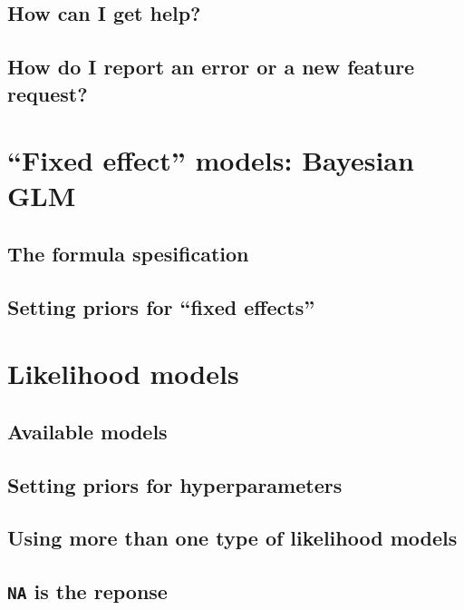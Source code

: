 \documentclass[a4paper,11pt]{report}
\newcommand{\tv}{\texttt}
\begin{document}
\section{How can I get help?}

\section{How do I report an error or a new feature request?}



\chapter{``Fixed effect'' models: Bayesian GLM}

\section{The formula spesification}

\section{Setting priors for ``fixed effects''}


\chapter{Likelihood models}

\section{Available models}

\section{Setting priors for hyperparameters}

\section{Using more than one type of likelihood models}

\section{\tv{NA} is the reponse}



\chapter{}
\end{document}
